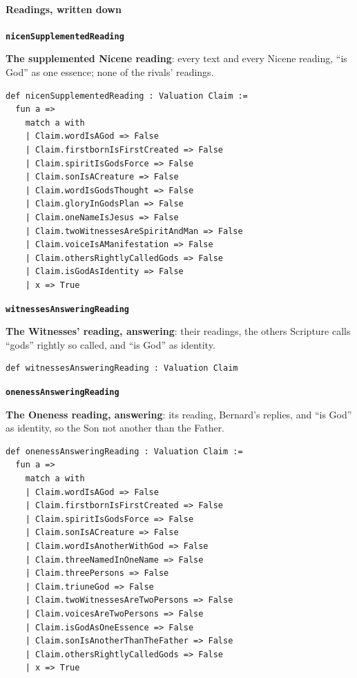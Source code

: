 \documentclass[11pt,paper=\testimonypaper,DIV=13,parskip=false]{scrartcl}
\begin{document}
\paragraph*{Readings, written down}
\leavevmode\par\nobreak
\par\medskip\noindent\textbf{\texttt{nicen\allowbreak{}Supplemented\allowbreak{}Reading}}\par\nobreak\noindent
\textbf{The supplemented Nicene reading}: every text and every Nicene reading, “is God” as one essence; none of the rivals’ readings.

{\small\begin{verbatim}
def nicenSupplementedReading : Valuation Claim :=
  fun a =>
    match a with
    | Claim.wordIsAGod => False
    | Claim.firstbornIsFirstCreated => False
    | Claim.spiritIsGodsForce => False
    | Claim.sonIsACreature => False
    | Claim.wordIsGodsThought => False
    | Claim.gloryInGodsPlan => False
    | Claim.oneNameIsJesus => False
    | Claim.twoWitnessesAreSpiritAndMan => False
    | Claim.voiceIsAManifestation => False
    | Claim.othersRightlyCalledGods => False
    | Claim.isGodAsIdentity => False
    | x => True
\end{verbatim}}
\par\medskip\noindent\textbf{\texttt{witnesses\allowbreak{}Answering\allowbreak{}Reading}}\par\nobreak\noindent
\textbf{The Witnesses’ reading, answering}: their readings, the others Scripture calls “gods” rightly so called, and “is God” as identity.

{\small\begin{verbatim}
def witnessesAnsweringReading : Valuation Claim
\end{verbatim}}
\par\medskip\noindent\textbf{\texttt{oneness\allowbreak{}Answering\allowbreak{}Reading}}\par\nobreak\noindent
\textbf{The Oneness reading, answering}: its reading, Bernard’s replies, and “is God” as identity, so the Son not another than the Father.

{\small\begin{verbatim}
def onenessAnsweringReading : Valuation Claim :=
  fun a =>
    match a with
    | Claim.wordIsAGod => False
    | Claim.firstbornIsFirstCreated => False
    | Claim.spiritIsGodsForce => False
    | Claim.sonIsACreature => False
    | Claim.wordIsAnotherWithGod => False
    | Claim.threeNamedInOneName => False
    | Claim.threePersons => False
    | Claim.triuneGod => False
    | Claim.twoWitnessesAreTwoPersons => False
    | Claim.voicesAreTwoPersons => False
    | Claim.isGodAsOneEssence => False
    | Claim.sonIsAnotherThanTheFather => False
    | Claim.othersRightlyCalledGods => False
    | x => True
\end{verbatim}}
\end{document}
